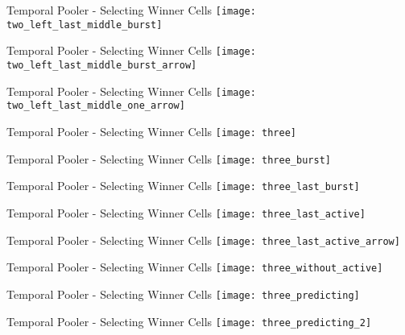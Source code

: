\begin{frame}[c]{Temporal Pooler - Selecting Winner Cells}
    \texttt{[image: two\_left\_last\_middle\_burst]}
\end{frame}

\begin{frame}[c]{Temporal Pooler - Selecting Winner Cells}
    \texttt{[image: two\_left\_last\_middle\_burst\_arrow]}
\end{frame}

\begin{frame}[c]{Temporal Pooler - Selecting Winner Cells}
    \texttt{[image: two\_left\_last\_middle\_one\_arrow]}
\end{frame}

\begin{frame}[c]{Temporal Pooler - Selecting Winner Cells}
    \texttt{[image: three]}
\end{frame}

\begin{frame}[c]{Temporal Pooler - Selecting Winner Cells}
    \texttt{[image: three\_burst]}
\end{frame}

\begin{frame}[c]{Temporal Pooler - Selecting Winner Cells}
    \texttt{[image: three\_last\_burst]}
\end{frame}

\begin{frame}[c]{Temporal Pooler - Selecting Winner Cells}
    \texttt{[image: three\_last\_active]}
\end{frame}

\begin{frame}[c]{Temporal Pooler - Selecting Winner Cells}
    \texttt{[image: three\_last\_active\_arrow]}
\end{frame}

\begin{frame}[c]{Temporal Pooler - Selecting Winner Cells}
    \texttt{[image: three\_without\_active]}
\end{frame}

\begin{frame}[c]{Temporal Pooler - Selecting Winner Cells}
    \texttt{[image: three\_predicting]}
\end{frame}

\begin{frame}[c]{Temporal Pooler - Selecting Winner Cells}
    \texttt{[image: three\_predicting\_2]}
\end{frame}




